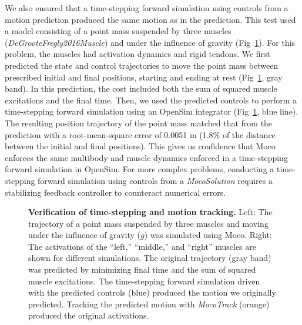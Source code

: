 \documentclass[10pt,letterpaper]{article}
\begin{document}
We also ensured that a time-stepping forward simulation using controls from a motion prediction produced the same motion as in the prediction. This test used a model consisting of a point mass suspended by three muscles (\textit{DeGrooteFregly2016Muscle}) and under the influence of gravity (Fig~\ref{verification}). For this problem, the muscles had activation dynamics and rigid tendons. We first predicted the state and control trajectories to move the point mass between prescribed initial and final positions, starting and ending at rest (Fig~\ref{verification}, gray band). In this prediction, the cost included both the sum of squared muscle excitations and the final time. Then, we used the predicted controls to perform a time-stepping forward simulation using an OpenSim integrator (Fig~\ref{verification}, blue line). The resulting position trajectory of the point mass matched that from the prediction with a root-mean-square error of 0.0051 m (1.8\% of the distance between the initial and final positions). This gives us confidence that Moco enforces the same multibody and muscle dynamics enforced in a time-stepping forward simulation in OpenSim. For more complex problems, conducting a time-stepping forward simulation using controls from a \textit{MocoSolution} requires a stabilizing feedback controller to counteract numerical errors.

\begin{figure}[!h]
        \centering
        \caption{{\bf Verification of time-stepping and motion tracking.}
            Left: The trajectory of a point mass suspended by three muscles and moving under the influence of gravity ($g$) was simulated using Moco. Right: The activations of the ``left,'' ``middle,'' and ``right'' muscles are shown for different simulations. The original trajectory (gray band) was predicted by minimizing final time and the sum of squared muscle excitations. The time-stepping forward simulation driven with the predicted controls (blue) produced the motion we originally predicted. Tracking the predicted motion with \textit{MocoTrack} (orange) produced the original activations.
        }
        \label{verification}
\end{figure}
\end{document}
